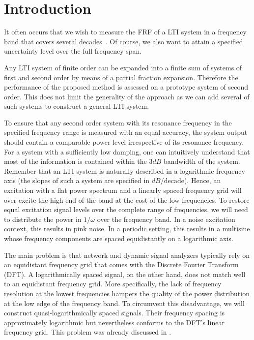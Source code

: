 


\section{Introduction} \label{sec:intro}
  It often occurs that we wish to measure the \gls{FRF} of a \gls{LTI} system in a frequency band that covers several decades~\citep{Bragos2001,Sanchez2011,Niedostatkiewicz2009,VanGheem2004}.
  Of course, we also want to attain a specified uncertainty level over the full frequency span.

  Any LTI system of finite order can be expanded into a  finite sum of systems of first and second order by means of a partial fraction expansion\citep{Oppenheim1983}.
  Therefore the performance of the proposed method is assessed on a prototype system of second order.
  This does not limit the generality of the approach as we can add several of such systems to construct a general LTI system.
  
  To ensure that any second order system with its resonance frequency in the specified frequency range is measured with an equal accuracy, the system output should contain a comparable power level irrespective of its resonance frequency.
  For a system with a sufficiently low damping, one can intuitively understand that most of the information is contained within the $3 \unit{dB}$ bandwidth of the system.
  Remember that an LTI system is naturally described in a logarithmic frequency axis (the slopes of such a system are specified in $\unit{dB}/\text{decade}$).
  Hence, an excitation with a flat power spectrum and a linearly spaced frequency grid will over-excite the high end of the band at the cost of the low frequencies.
  To restore equal excitation signal levels over the complete range of frequencies, we will need to distribute the power in $1/\omega$ over the frequency band.
  In a noise excitation context, this results in pink noise.
  In a periodic setting, this results in a multisine whose frequency components are spaced equidistantly on a logarithmic axis.
  
  The main problem is that network and dynamic signal analyzers typically
  rely on an equidistant frequency grid that comes with the Discrete Fourier Transform (DFT).
  A logarithmically spaced signal, on the other hand, does not match well to an equidistant frequency grid.
  More specifically, the lack of frequency resolution at the lowest frequencies hampers the quality of the power distribution at the low edge of the frequency band.
  To circumvent this disadvantage, we will construct quasi-logarithmically spaced signals.
  Their frequency spacing is approximately logarithmic but nevertheless conforms to the DFT's linear frequency grid.
  This problem was already discussed in \citet{Geerardyn2012IMTC}.

